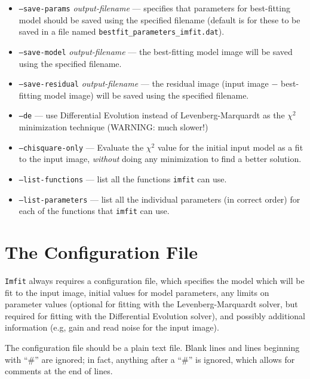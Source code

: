 \documentclass[10pt]{article}
\newcommand{\imfit}{\texttt{imfit}}
\begin{document}
\begin{itemize}
\bigskip

\item \texttt{--save-params} \textit{output-filename} --- specifies that parameters 
for best-fitting model should be saved using the specified filename (default is
for these to be saved in a file named \texttt{bestfit\_parameters\_imfit.dat}).
\item \texttt{--save-model} \textit{output-filename} --- the best-fitting model image
will be saved using the specified filename.
\item \texttt{--save-residual} \textit{output-filename} --- the residual image (input
image $-$ best-fitting model image) will be saved using the specified filename.

\bigskip
\item \texttt{--de} --- use Differential Evolution instead of Levenberg-Marquardt as
the $\chi^2$ minimization technique (WARNING: much slower!)
\item \texttt{--chisquare-only} --- Evaluate the $\chi^2$ value for the initial input
model as a fit to the input image, \textit{without} doing any minimization to find
a better solution.

\bigskip

\item \texttt{--list-functions} --- list all the functions \imfit{} can use.

\item \texttt{--list-parameters} --- list all the individual parameters (in correct order)
for each of the functions that \imfit{} can use.
\end{itemize}




\section{The Configuration File}\label{sec:configfile}

\texttt{Imfit} always requires a configuration file, which specifies the model
which will be fit to the input image, initial values for model parameters, any
limits on parameter values (optional for fitting with the Levenberg-Marquardt
solver, but required for fitting with the Differential Evolution solver), and
possibly additional information (e.g, gain and read noise for the input image).

The configuration file should be a plain text file. Blank lines and
lines beginning with ``\#'' are ignored; in fact, anything after a
``\#'' is ignored, which allows for comments at the end of lines.
\end{document}
